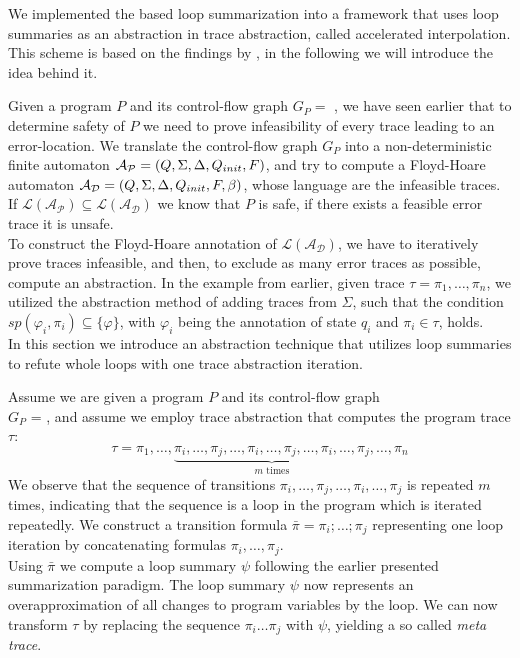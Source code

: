 
We implemented the \qvasr based loop summarization into a framework that uses loop summaries as an abstraction in trace abstraction, called accelerated interpolation. This scheme is based on the findings by \cite{10.1007/978-3-642-33386-6_16}, in the following we will introduce the idea behind it. \par Given a program $P$ and its control-flow graph $G_P = $ \cfg, we have seen earlier that to determine safety of $P$ we need to prove infeasibility of every trace leading to an error-location. We translate the control-flow graph $G_P$ into a non-deterministic finite automaton $\mathcal{A_{P}} = (Q, \Sigma, \Delta, Q_{init}, F)$, and try to compute a Floyd-Hoare automaton $\mathcal{A_{D}} = (Q, \Sigma, \Delta, Q_{init}, F, \beta)$, whose language are the infeasible traces. If $\mathcal{L(A_P)} \subseteq \mathcal{L(A_D)}$ we know that $P$ is safe, if there exists a feasible error trace it is unsafe. \\ To construct the Floyd-Hoare annotation of $\mathcal{L(A_D)}$, we have to iteratively prove traces infeasible, and then, to exclude as many error traces as possible, compute an abstraction. In the example from earlier, given trace $\tau = \pi_1, \ldots, \pi_n$, we utilized the abstraction method of adding traces from $\Sigma$, such that the condition $sp(\varphi_i, \pi_i) \subseteq \{\varphi\}$, with $\varphi_i$ being the annotation of state $q_i$ and $\pi_i \in \tau$, holds. \\
In this section we introduce an abstraction technique that utilizes loop summaries to refute whole loops with one trace abstraction iteration. \par
Assume we are given a program $P$ and its control-flow graph \\ $G_P$ = \cfg, and assume we employ trace abstraction that computes the program trace $\tau$:
\begin{equation*}
	\tau = \pi_1, \ldots, \underbrace{\pi_i, \ldots, \pi_j, \ldots, \pi_i, \ldots, \pi_j, \ldots, \pi_i, \ldots, \pi_j}_{m \text{ times}}, \ldots, \pi_n
\end{equation*}
We observe that the sequence of transitions $\pi_i, \ldots, \pi_j, \ldots, \pi_i, \ldots, \pi_j$ is repeated $m$ times, indicating that the sequence is a loop in the program which is iterated repeatedly. We construct a transition formula $\bar{\pi} = \pi_i; \ldots; \pi_j$ representing one loop iteration by concatenating formulas $\pi_i, \ldots, \pi_j$. \\
Using $\bar{\pi}$ we compute a \qvasr loop summary $\psi$ following the earlier presented summarization paradigm. The loop summary $\psi$ now represents an overapproximation of all changes to program variables by the loop. We can now transform $\tau$ by replacing the sequence $\pi_i \ldots \pi_j$ with $\psi$, yielding a so called \textsl{meta trace}.

